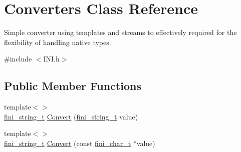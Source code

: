 \hypertarget{class_converters}{}\section{Converters Class Reference}
\label{class_converters}


Simple converter using templates and streams to effectively required for the flexibility of handling native types.  




{\ttfamily \#include $<$I\+N\+I.\+h$>$}

\subsection*{Public Member Functions}
\begin{DoxyCompactItemize}
\item 
{\footnotesize template$<$$>$ }\\\hyperlink{_i_n_i_8h_a38d09ae9d340b15b8580649e578974db}{fini\+\_\+string\+\_\+t} \hyperlink{class_converters_a8b7ab4d162cc0cc1ea82608fe298659e}{Convert} (\hyperlink{_i_n_i_8h_a38d09ae9d340b15b8580649e578974db}{fini\+\_\+string\+\_\+t} value)
\item 
{\footnotesize template$<$$>$ }\\\hyperlink{_i_n_i_8h_a38d09ae9d340b15b8580649e578974db}{fini\+\_\+string\+\_\+t} \hyperlink{class_converters_a559c3ed23aa7990e81304b9ec770d44d}{Convert} (const \hyperlink{_i_n_i_8h_a03d482c4c241009c15ce537c9df118df}{fini\+\_\+char\+\_\+t} $\ast$value)
\end{DoxyCompactItemize}

